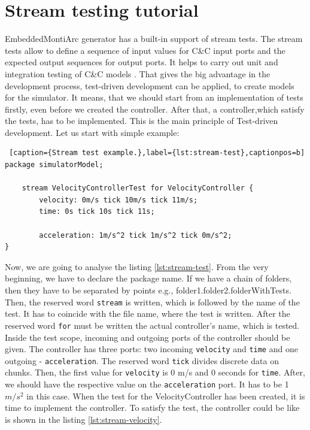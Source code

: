 \section{Stream testing tutorial}
EmbeddedMontiArc generator has a built-in support of stream tests. The stream tests allow to define a sequence of input values for C\&C input ports and the expected output sequences for output ports. It helps to carry out
unit and integration testing of C\&C models \cite{KRB96}. That gives the big advantage in the development process, test-driven development \cite{TDD} can be applied, to create models for the simulator. It means, that we should start from an implementation of tests firstly, even before we created the controller. After that, a controller,which satisfy the tests, has to be implemented. This is the main principle of Test-driven development. Let us start with simple example:
\bigskip
\begin{lstlisting} [caption={Stream test example.},label={lst:stream-test},captionpos=b]
package simulatorModel;

    stream VelocityControllerTest for VelocityController {
        velocity: 0m/s tick 10m/s tick 11m/s;
        time: 0s tick 10s tick 11s;

        acceleration: 1m/s^2 tick 1m/s^2 tick 0m/s^2;
}
\end{lstlisting}
\bigskip
Now, we are going to analyse the listing \ref{lst:stream-test}. From the very beginning, we have to declare the package name. If we have a chain of folders, then they have to be separated by points e.g., folder1.folder2.folderWithTests. Then, the reserved word \texttt{stream} is written, which is followed by the name of the test. It has to coincide with the file name, where the test is written. After the reserved word \texttt{for} must be written the actual controller's name, which is tested. Inside the test scope, incoming and outgoing ports of the controller should be given. The controller has three ports: two incoming \texttt{velocity} and \texttt{time} and one outgoing - \texttt{acceleration}. The reserved word \texttt{tick} divides discrete data on chunks. Then, the first value for \texttt{velocity} is 0 m/s and 0 seconds for \texttt{time}. After, we should have the respective value on the \texttt{acceleration} port. It has to be 1 $m/s^2$ in this case.\newline
When the test for the VelocityController has been created, it is time to implement the controller. To satisfy the test, the controller could be like is shown in the listing \ref{lst:stream-velocity}.
